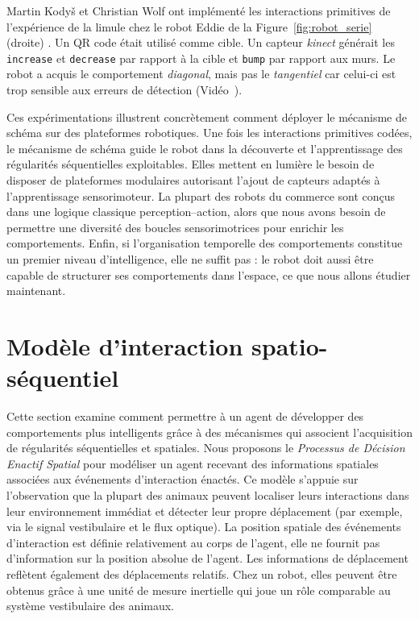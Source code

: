 Martin Kody\v{s} et Christian Wolf ont implémenté les interactions primitives de l'expérience de la limule chez le robot Eddie de la Figure~\ref{fig:robot_serie} (droite) \cite{kodis_approche_2014}.   
Un QR code était utilisé comme cible. 
Un capteur \emph{kinect} générait les  \texttt{increase} et \texttt{decrease} par rapport à la cible et \texttt{bump} par rapport aux murs.
Le robot a acquis le comportement \emph{diagonal}, mais pas le \emph{tangentiel} car celui-ci est trop sensible aux erreurs de détection  
(Vidéo~).

Ces expérimentations illustrent concrètement comment déployer le mécanisme de schéma sur des plateformes robotiques. 
Une fois les interactions primitives codées, le mécanisme de schéma guide le robot dans la découverte et l'apprentissage des régularités séquentielles exploitables. 
Elles mettent en lumière le besoin de disposer de plateformes modulaires autorisant l'ajout de capteurs adaptés à l'apprentissage sensorimoteur.
La plupart des robots du commerce sont conçus dans une logique classique perception--action, alors que nous avons besoin de permettre une diversité des boucles sensorimotrices pour enrichir les comportements.
Enfin, si l'organisation temporelle des comportements constitue un premier niveau d'intelligence, elle ne suffit pas : le robot doit aussi être capable de structurer ses comportements dans l'espace, ce que nous allons étudier maintenant.


\section{Modèle d'interaction spatio-séquentiel}
\label{sec:ECA}

\noindent
Cette section examine comment permettre à un agent de développer des comportements plus intelligents grâce à des mécanismes qui associent l'acquisition de régularités séquentielles et spatiales.
Nous proposons le \emph{Processus de Décision Enactif Spatial} pour modéliser un agent recevant des informations spatiales associées aux événements d'interaction énactés. 
Ce modèle s'appuie sur l'observation que la plupart des animaux peuvent localiser leurs interactions dans leur environnement immédiat et détecter leur propre déplacement (par exemple, via le signal vestibulaire et le flux optique).
La position spatiale des événements d'interaction est définie relativement au corps de l'agent, elle ne fournit pas d'information sur la position absolue de l'agent.
Les informations de déplacement reflètent également des déplacements relatifs.
Chez un robot, elles peuvent être obtenus grâce à une unité de mesure inertielle qui joue un rôle comparable au système vestibulaire des animaux.


